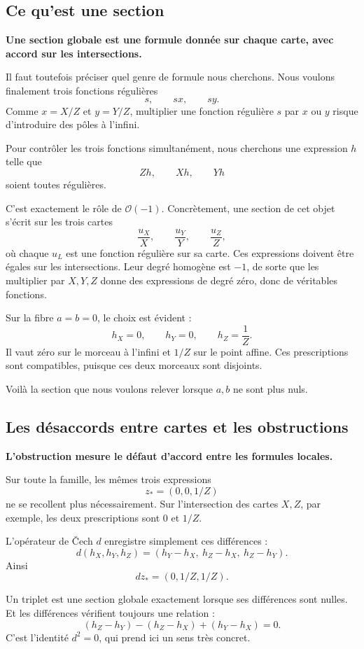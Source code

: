 \documentclass[11pt,a4paper]{article}
\newcommand{\OO}{\mathcal O}
\begin{document}
\subsection*{Ce qu'est une section}

\textbf{Une section globale est une formule donnée sur chaque carte,
avec accord sur les intersections.}

Il faut toutefois préciser quel genre de formule nous cherchons. Nous
voulons finalement trois fonctions régulières
\[
 s,\qquad sx,\qquad sy.
\]
Comme $x=X/Z$ et $y=Y/Z$, multiplier une fonction régulière $s$ par $x$
ou $y$ risque d'introduire des pôles à l'infini.

Pour contrôler les trois fonctions simultanément, nous cherchons une
expression $h$ telle que
\[
 Zh,\qquad Xh,\qquad Yh
\]
soient toutes régulières.

C'est exactement le rôle de $\OO(-1)$. Concrètement, une section de cet
objet s'écrit sur les trois cartes
\[
 \frac{u_X}{X},\qquad \frac{u_Y}{Y},\qquad \frac{u_Z}{Z},
\]
où chaque $u_L$ est une fonction régulière sur sa carte. Ces expressions
doivent être égales sur les intersections. Leur degré homogène est $-1$,
de sorte que les multiplier par $X,Y,Z$ donne des expressions de degré
zéro, donc de véritables fonctions.

Sur la fibre $a=b=0$, le choix est évident :
\[
 h_X=0,\qquad h_Y=0,\qquad h_Z=\frac1Z.
\]
Il vaut zéro sur le morceau à l'infini et $1/Z$ sur le point affine.
Ces prescriptions sont compatibles, puisque ces deux morceaux sont
disjoints.

Voilà la section que nous voulons relever lorsque $a,b$ ne sont plus
nuls.

\subsection*{Les désaccords entre cartes et les obstructions}

\textbf{L'obstruction mesure le défaut d'accord entre les formules
locales.}

Sur toute la famille, les mêmes trois expressions
\[
 z_*=(0,0,1/Z)
\]
ne se recollent plus nécessairement. Sur l'intersection des cartes $X,Z$,
par exemple, les deux prescriptions sont $0$ et $1/Z$.

L'opérateur de Čech $d$ enregistre simplement ces différences :
\[
 d(h_X,h_Y,h_Z)
   =(h_Y-h_X,\ h_Z-h_X,\ h_Z-h_Y).
\]
Ainsi
\[
 dz_*=(0,1/Z,1/Z).
\]

Un triplet est une section globale exactement lorsque ses différences
sont nulles. Et les différences vérifient toujours une relation :
\[
 (h_Z-h_Y)-(h_Z-h_X)+(h_Y-h_X)=0.
\]
C'est l'identité $d^2=0$, qui prend ici un sens très concret.
\end{document}
